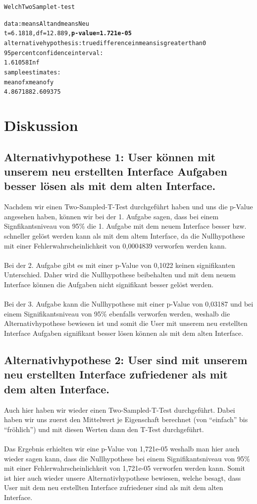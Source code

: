 \documentclass[a4paper,10pt]{scrartcl}
\begin{document}
\begin{alltt}
Welch Two Sample t-test

data:  meansAlt and meansNeu 
t = 6.1818, df = 12.889, \textbf{p-value = 1.721e-05}
alternative hypothesis: true difference in means is greater than 0 
95 percent confidence interval:
 1.61058     Inf 
sample estimates:
mean of x mean of y 
 4.867188  2.609375 
\end{alltt} 

\section{Diskussion}

\subsection{Alternativhypothese 1:  User können mit unserem neu erstellten Interface Aufgaben besser lösen als mit dem alten Interface.} 

Nachdem wir einen Two-Sampled-T-Test durchgeführt haben und uns die p-Value angesehen haben, können wir bei
der 1. Aufgabe sagen, dass bei einem Signfikantsniveau von 95\% die 1. Aufgabe mit dem neuem Interface besser bzw. schneller gelöst werden
kann als mit dem altem Interface, da die Nullhypothese mit einer Fehlerwahrscheinlichkeit von 0,0004839 verworfen werden kann.
\\ \\
Bei der 2. Aufgabe gibt es mit einer p-Value von 0,1022 keinen signifikanten Unterschied. Daher wird die Nullhypothese beibehalten und
mit dem neuem Interface können die Aufgaben nicht signifikant besser gelöst werden.
\\ \\
Bei der 3. Aufgabe kann die Nullhypothese mit einer p-Value von 0,03187 und bei einem Signifikantsniveau von 95\% ebenfalls verworfen werden,
weshalb die Alternativhypothese bewiesen ist und somit die User mit unserem neu erstellten Interface Aufgaben signifikant besser lösen können
als mit dem alten Interface.

\subsection{Alternativhypothese 2: User sind mit unserem neu erstellten Interface zufriedener als mit dem alten Interface. }

Auch hier haben wir wieder einen Two-Sampled-T-Test durchgeführt. Dabei haben wir uns zuerst den Mittelwert je Eigenschaft
berechnet (von ``einfach'' bis ``fröhlich'') und mit diesen Werten dann den T-Test durchgeführt.
\\ \\
Das Ergebnis erhielten wir eine p-Value von 1,721e-05 weshalb man hier auch wieder sagen kann, dass die Nullhypothese bei
einem Signifikantsniveau von 95\% mit einer Fehlerwahrscheinlichkeit von 1,721e-05 verworfen werden kann. Somit ist hier auch wieder unsere
Alternativhypothese bewiesen, welche besagt, dass User mit dem neu erstellten Interface zufriedener sind als mit dem alten Interface.
\end{document}
